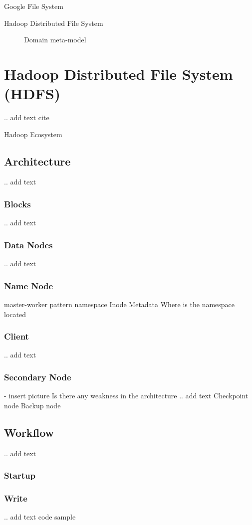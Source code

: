 \documentclass{sig-alternate}
\begin{document}
Google File System

Hadoop Distributed File System

\begin{figure}
\centering
{}
\caption{Domain meta-model}
\label{fig:metamodel}
\end{figure}


\section{Hadoop Distributed File System (HDFS)}
.. add text cite~\cite{hadoop1}

Hadoop Ecosystem

\subsection{Architecture}
.. add text
\subsubsection{Blocks}
.. add text
\subsubsection{Data Nodes}
.. add text
\subsubsection{Name Node}
master-worker pattern
namespace
Inode
Metadata
Where is the namespace located

\subsubsection{Client}
.. add text
\subsubsection{Secondary Node}
- insert picture
Is there any weakness in the architecture
.. add text
Checkpoint node
Backup node

\subsection{Workflow}
.. add text
\subsubsection{Startup}
\subsubsection{Write}
.. add text code sample
\end{document}
